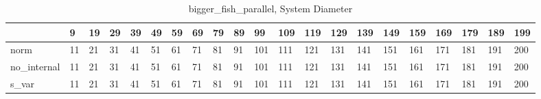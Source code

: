 \begin{table}
\caption{bigger_fish_parallel, System Diameter}
\label{bigger_fish_parallel_diam}
\begin{tabular}{lllllllllllllllllllll}
\toprule
 & 9 & 19 & 29 & 39 & 49 & 59 & 69 & 79 & 89 & 99 & 109 & 119 & 129 & 139 & 149 & 159 & 169 & 179 & 189 & 199 \\
\midrule
norm & 11 & 21 & 31 & 41 & 51 & 61 & 71 & 81 & 91 & 101 & 111 & 121 & 131 & 141 & 151 & 161 & 171 & 181 & 191 & 200 \\
no_internal & 11 & 21 & 31 & 41 & 51 & 61 & 71 & 81 & 91 & 101 & 111 & 121 & 131 & 141 & 151 & 161 & 171 & 181 & 191 & 200 \\
s_var & 11 & 21 & 31 & 41 & 51 & 61 & 71 & 81 & 91 & 101 & 111 & 121 & 131 & 141 & 151 & 161 & 171 & 181 & 191 & 200 \\
\bottomrule
\end{tabular}
\end{table}
